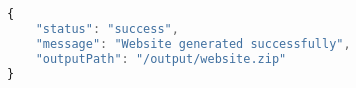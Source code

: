 \begin{lstlisting}[language=Javascript,caption={Response Data untuk Endpoint `POST /generate`}]
{
    "status": "success",
    "message": "Website generated successfully",
    "outputPath": "/output/website.zip"
}
\end{lstlisting}